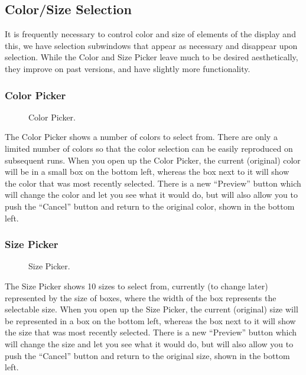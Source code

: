 
\subsection{Color/Size Selection}
\label{sec:control-color} 

It is frequently necessary to control color and size of elements of the
\map{} display and this, we have selection subwindows that appear as
necessary and disappear upon selection.  While the Color and Size Picker
leave much to be desired aesthetically, they improve on past versions, and
have slightly more functionality.


\subsubsection{Color Picker}

\begin{figure}[htb]
  \begin{makeimage}
  \end{makeimage}
  \caption{\label{fig:colorpicker1} Color Picker.}
\end{figure}


The Color Picker shows a number of colors to select from.  There are only a
limited number of colors so that the color selection can be easily
reproduced on subsequent runs.  When you open up the Color Picker, the
current (original) color will be in a small box on the bottom left, whereas
the box next to it will show the color that was most recently selected.
There is a new ``Preview'' button which will change the color and let you
see what it would do, but will also allow you to push the ``Cancel'' button
and return to the original color, shown in the bottom left.

\subsubsection{Size Picker}

\begin{figure}[htb]
  \begin{makeimage}
  \end{makeimage}
  \sizepicker
  \caption{\label{fig:sizepicker1} Size Picker.}
\end{figure}


The Size Picker shows 10 sizes to select from, currently (to change later)
represented by the size of boxes, where the width of the box represents the
selectable size.  When you open up the Size Picker, the current (original)
size will be represented in a box on the bottom left, whereas the box next
to it will show the size that was most recently selected.  There is a new
``Preview'' button which will change the size and let you see what it would
do, but will also allow you to push the ``Cancel'' button and return to the
original size, shown in the bottom left.

